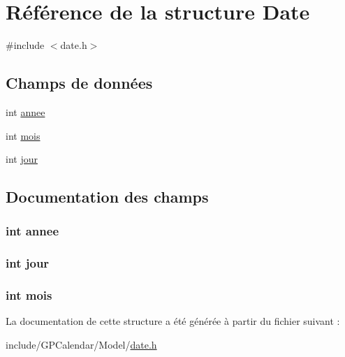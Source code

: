 \hypertarget{struct_date}{\section{Référence de la structure Date}
\label{struct_date}
}


{\ttfamily \#include $<$date.\-h$>$}

\subsection*{Champs de données}
\begin{DoxyCompactItemize}
\item 
int \hyperlink{struct_date_acfe2ff64f5396827db36f1575c5e99d8}{annee}
\item 
int \hyperlink{struct_date_af4d47133f30c1a134b6cecf5cedd7db9}{mois}
\item 
int \hyperlink{struct_date_aec8e61b4e27d935e47eba0485425da38}{jour}
\end{DoxyCompactItemize}


\subsection{Documentation des champs}
\hypertarget{struct_date_acfe2ff64f5396827db36f1575c5e99d8}{
\subsubsection[{annee}]{\setlength{\rightskip}{0pt plus 5cm}int annee}}\label{struct_date_acfe2ff64f5396827db36f1575c5e99d8}
\hypertarget{struct_date_aec8e61b4e27d935e47eba0485425da38}{
\subsubsection[{jour}]{\setlength{\rightskip}{0pt plus 5cm}int jour}}\label{struct_date_aec8e61b4e27d935e47eba0485425da38}
\hypertarget{struct_date_af4d47133f30c1a134b6cecf5cedd7db9}{
\subsubsection[{mois}]{\setlength{\rightskip}{0pt plus 5cm}int mois}}\label{struct_date_af4d47133f30c1a134b6cecf5cedd7db9}


La documentation de cette structure a été générée à partir du fichier suivant \-:\begin{DoxyCompactItemize}
\item 
include/\-G\-P\-Calendar/\-Model/\hyperlink{date_8h}{date.\-h}\end{DoxyCompactItemize}
